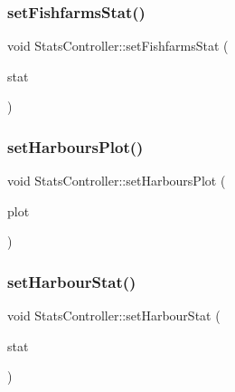 \mbox{\label{class_stats_controller_abc5a66c3e54b9f41b18384d16240bd88}} 
\subsubsection{\texorpdfstring{setFishfarmsStat()}{setFishfarmsStat()}}
{\footnotesize\ttfamily void Stats\+Controller\+::set\+Fishfarms\+Stat (\begin{DoxyParamCaption}\item[{\mbox{\hyperlink{namespacedisplace_1_1plot_a4746af73ffe0625cf87b8fb07fd5bfa4}{displace\+::plot\+::\+Fishfarms\+Stat}}}]{stat }\end{DoxyParamCaption})}

\mbox{\label{class_stats_controller_a00915ed17a2bbe0fa01d640b63555adb}} 
\subsubsection{\texorpdfstring{setHarboursPlot()}{setHarboursPlot()}}
{\footnotesize\ttfamily void Stats\+Controller\+::set\+Harbours\+Plot (\begin{DoxyParamCaption}\item[{\mbox{\hyperlink{class_plot_widget}{Plot\+Widget}} $\ast$}]{plot }\end{DoxyParamCaption})}

\mbox{\label{class_stats_controller_a8103697a8db6e077b8e2621db3e938f7}} 
\subsubsection{\texorpdfstring{setHarbourStat()}{setHarbourStat()}}
{\footnotesize\ttfamily void Stats\+Controller\+::set\+Harbour\+Stat (\begin{DoxyParamCaption}\item[{\mbox{\hyperlink{namespacedisplace_1_1plot_a006fcde9bb7e602d977226ff75cb67aa}{displace\+::plot\+::\+Harbours\+Stat}}}]{stat }\end{DoxyParamCaption})}

